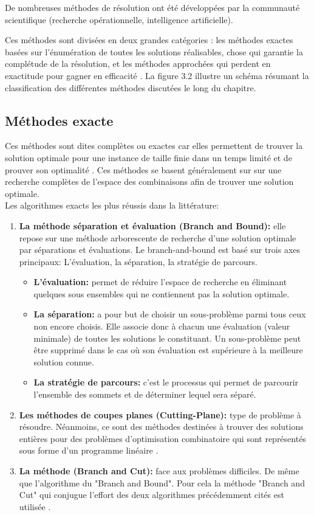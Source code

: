 De nombreuses méthodes de résolution ont été développées par la communauté scientifique (recherche opérationnelle, intelligence artificielle).

Ces méthodes sont divisées en deux grandes catégories : les méthodes exactes basées sur l’énumération de toutes les solutions réalisables, chose qui garantie la complétude de la résolution, et les méthodes approchées qui perdent en exactitude pour gagner en efficacité \cite{park2007dominating} . La figure 3.2 illustre un schéma résumant la classification des différentes méthodes discutées le long du chapitre.

\subsection{Méthodes exacte}
Ces méthodes sont dites complètes ou exactes car elles permettent de trouver la solution optimale pour une instance de taille finie dans un temps limité et de prouver son optimalité \cite{puchinger2005combining} . Ces méthodes se basent généralement sur sur une recherche complètes de l’espace des combinaisons afin de trouver une solution optimale.\\
Les algorithmes exacts les plus réussis dans la littérature: 


\begin{enumerate}[label=\alph*)]
	\item \textbf{La méthode séparation et évaluation (Branch and Bound):} elle repose sur une méthode arborescente de recherche d’une solution optimale par séparations et évaluations. Le branch-and-bound est basé sur trois axes principaux: L’évaluation, la séparation, la stratégie de parcours.
	\begin{itemize}
		\item \textbf{L’évaluation: } permet de réduire l’espace de recherche en éliminant quelques sous ensembles qui ne contiennent pas la solution optimale.
		\item \textbf{La séparation: } a pour but de choisir un sous-problème parmi tous ceux non encore choisis. Elle associe donc à chacun une évaluation (valeur minimale) de toutes les solutions le constituant. Un sous-problème peut être supprimé dans le cas où son évaluation est supérieure à la meilleure solution connue.
		\item \textbf{La stratégie de parcours: } c’est le processus qui permet de parcourir l’ensemble des sommets et de déterminer lequel sera séparé.
	\end{itemize}
	\item \textbf{Les méthodes de coupes planes (Cutting-Plane): }type de problème à résoudre. Néanmoins, ce sont des méthodes destinées à trouver des solutions entières pour des problèmes d’optimisation combinatoire qui sont représentés sous forme d’un programme linéaire \cite{schrijver1986theory} .
	\item \textbf{La méthode (Branch and Cut): }face aux problèmes difficiles. De même que l’algorithme du "Branch and Bound". Pour cela la méthode "Branch and Cut" qui conjugue l’effort des deux algorithmes précédemment cités est utilisée \cite{padberg1991branch,padberg1987optimization} .
\end{enumerate}

